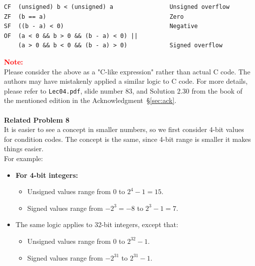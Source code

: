 \documentclass{article}
\begin{document}
\begin{Verbatim}[frame=single]
CF  (unsigned) b < (unsigned) a                Unsigned overflow
ZF  (b == a)                                   Zero
SF  ((b - a) < 0)                              Negative
OF  (a < 0 && b > 0 && (b - a) < 0) || 
    (a > 0 && b < 0 && (b - a) > 0)            Signed overflow
\end{Verbatim}
\noindent\textbf{\textcolor{red}{Note:}} \\
Please consider the above as a "C-like expression" rather than actual C code. The authors may have mistakenly applied a similar logic to C code. For more details, please refer to \texttt{Lec04.pdf}, slide number 83, and Solution 2.30 from the book of the mentioned edition in the Acknowledgment~\S\ref{sec:ack}. \\
\\
\noindent\textbf{Related Problem 8} \\
It is easier to see a concept in smaller numbers, so we first consider 4-bit values for condition codes. The concept is the same, since 4-bit range is smaller it makes things easier. \\

For example: 
\begin{itemize}
    \item \textbf{For 4-bit integers:}
    \begin{itemize}
        \item Unsigned values range from $0$ to $2^4 - 1 = 15$.
        \item Signed values range from $-2^3 = -8$ to $2^3 - 1 = 7$.
    \end{itemize}
    \item The same logic applies to 32-bit integers, except that:
    \begin{itemize}
        \item Unsigned values range from $0$ to $2^{32} - 1$.
        \item Signed values range from $-2^{31}$ to $2^{31} - 1$.
    \end{itemize}
\end{itemize}
\end{document}
